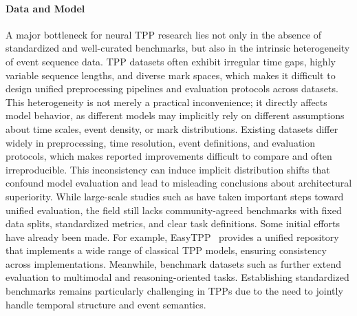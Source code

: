 \documentclass[10pt]{article} %
\begin{document}
\paragraph{Data and Model}
A major bottleneck for neural TPP research lies not only in the absence of standardized and well-curated benchmarks, but also in the intrinsic heterogeneity of event sequence data. TPP datasets often exhibit irregular time gaps, highly variable sequence lengths, and diverse mark spaces, which makes it difficult to design unified preprocessing pipelines and evaluation protocols across datasets. This heterogeneity is not merely a practical inconvenience; it directly affects model behavior, as different models may implicitly rely on different assumptions about time scales, event density, or mark distributions. 
Existing datasets differ widely in preprocessing, time resolution, event definitions, and evaluation protocols, which makes reported improvements difficult to compare and often irreproducible. This inconsistency can induce implicit distribution shifts that confound model evaluation and lead to misleading conclusions about architectural superiority. 
While large-scale studies such as \citet{bosser2023predictive} have taken important steps toward unified evaluation, the field still lacks community-agreed benchmarks with fixed data splits, standardized metrics, and clear task definitions. 
Some initial efforts have already been made. For example, EasyTPP~\citep{xueeasytpp} provides a unified repository that implements a wide range of classical TPP models, ensuring consistency across implementations. Meanwhile, benchmark datasets such as \citet{jiang2025danmakutppbench} further extend evaluation to multimodal and reasoning-oriented tasks. Establishing standardized benchmarks remains particularly challenging in TPPs due to the need to jointly handle temporal structure and event semantics.
\end{document}
